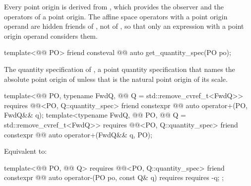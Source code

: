 \pnum
Every point origin is derived from ,
which provides the observer and the operators of a point origin.
The affine space operators with a point origin operand are hidden friends of ,
not of ,
so that only an expression with a point origin operand considers them.

\begin{itemdecl}
template<@@ PO>
friend consteval @@ auto get_quantity_spec(PO po);
\end{itemdecl}

\begin{itemdescr}
\pnum
\returns
The quantity specification of ,
a point quantity specification that names the absolute point origin of 
unless that is the natural point origin of its scale.
\end{itemdescr}

\begin{itemdecl}
template<@@ PO, typename FwdQ, @@ Q = std::remove_cvref_t<FwdQ>>
  requires @@<PO, Q::quantity_spec>
friend constexpr @@ auto operator+(PO, FwdQ&& q);
template<typename FwdQ, @@ PO, @@ Q = std::remove_cvref_t<FwdQ>>
  requires @@<PO, Q::quantity_spec>
friend constexpr @@ auto operator+(FwdQ&& q, PO);
\end{itemdecl}

\begin{itemdescr}
\pnum
\effects
Equivalent to:
\end{itemdescr}

\begin{itemdecl}
template<@@ PO, @@ Q>
  requires @@<PO, Q::quantity_spec>
friend constexpr @@ auto operator-(PO po, const Q& q)
  requires requires { -q; };
\end{itemdecl}

